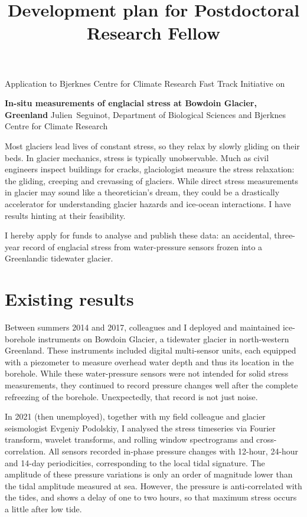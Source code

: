 \documentclass{article}
\title{Development plan for Postdoctoral Research Fellow}
\begin{document}
\setlength{\parskip}{0.5\baselineskip}

    Application to Bjerknes Centre for Climate Research
    Fast Track Initiative on

    \begin{center}
      \textbf{
        In-situ measurements of englacial stress at Bowdoin Glacier, Greenland}
      Julien~Seguinot,
      Department of Biological Sciences and
      Bjerknes Centre for Climate Research
    \end{center}

    Most glaciers lead lives of constant stress, so they relax by slowly
    gliding on their beds. In glacier mechanics, stress is typically
    unobservable. Much as civil engineers inspect buildings for cracks,
    glaciologist measure the stress relaxation: the gliding, creeping and
    crevassing of glaciers. While direct stress measurements in glacier may
    sound like a theoretician's dream, they could be a drastically accelerator
    for understanding glacier hazards and ice-ocean interactions. I have
    results hinting at their feasibility.

    I hereby apply for funds to analyse and publish these data: an accidental,
    three-year record of englacial stress from water-pressure sensors frozen
    into a Greenlandic tidewater glacier.

\section{Existing results}

    Between summers 2014 and 2017, colleagues and I deployed and maintained
    ice-borehole instruments on Bowdoin Glacier, a tidewater glacier in
    north-western Greenland. These instruments included digital multi-sensor
    units, each equipped with a piezometer to measure overhead water depth and
    thus its location in the borehole. While these water-pressure sensors were
    not intended for solid stress measurements, they continued to record
    pressure changes well after the complete refreezing of the borehole.
    Unexpectedly, that record is not just noise.

    In 2021 (then unemployed), together with my field colleague and glacier
    seismologist Evgeniy Podolskiy, I analysed the stress timeseries via
    Fourier transform, wavelet transforms, and rolling window spectrograms and
    cross-correlation.
    All sensors recorded in-phase pressure changes with 12-hour, 24-hour and
    14-day periodicities, corresponding to the local tidal signature.
    The amplitude of these pressure variations is only an order of magnitude
    lower than the tidal amplitude measured at sea. However, the pressure is
    anti-correlated with the tides, and shows a delay of one to two hours, so
    that maximum stress occurs a little after low tide.
\end{document}
